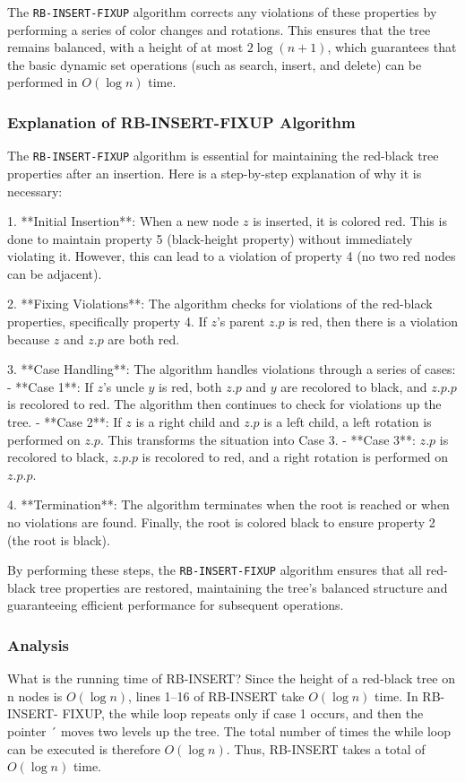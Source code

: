 The \texttt{RB-INSERT-FIXUP} algorithm corrects any violations of these properties by performing a series of color changes and rotations. This ensures that the tree remains balanced, with a height of at most $2\log(n+1)$, which guarantees that the basic dynamic set operations (such as search, insert, and delete) can be performed in $O(\log n)$ time.

\subsubsection*{Explanation of RB-INSERT-FIXUP Algorithm}

The \texttt{RB-INSERT-FIXUP} algorithm is essential for maintaining the red-black tree properties after an insertion. Here is a step-by-step explanation of why it is necessary:

1. **Initial Insertion**: When a new node \(z\) is inserted, it is colored red. This is done to maintain property 5 (black-height property) without immediately violating it. However, this can lead to a violation of property 4 (no two red nodes can be adjacent).

2. **Fixing Violations**: The algorithm checks for violations of the red-black properties, specifically property 4. If \(z\)'s parent \(z.p\) is red, then there is a violation because \(z\) and \(z.p\) are both red.

3. **Case Handling**: The algorithm handles violations through a series of cases:
    - **Case 1**: If \(z\)'s uncle \(y\) is red, both \(z.p\) and \(y\) are recolored to black, and \(z.p.p\) is recolored to red. The algorithm then continues to check for violations up the tree.
    - **Case 2**: If \(z\) is a right child and \(z.p\) is a left child, a left rotation is performed on \(z.p\). This transforms the situation into Case 3.
    - **Case 3**: \(z.p\) is recolored to black, \(z.p.p\) is recolored to red, and a right rotation is performed on \(z.p.p\).

4. **Termination**: The algorithm terminates when the root is reached or when no violations are found. Finally, the root is colored black to ensure property 2 (the root is black).

By performing these steps, the \texttt{RB-INSERT-FIXUP} algorithm ensures that all red-black tree properties are restored, maintaining the tree's balanced structure and guaranteeing efficient performance for subsequent operations.


\subsubsection*{Analysis}

What is the running time of RB-INSERT? Since the height of a red-black tree on n
nodes is $O(\log n)$, lines 1–16 of RB-INSERT take $O(\log n)$ time. In RB-INSERT-
FIXUP, the while loop repeats only if case 1 occurs, and then the pointer ´ moves
two levels up the tree. The total number of times the while loop can be executed
is therefore $O(\log n)$. Thus, RB-INSERT takes a total of $O(\log n)$ time. 








